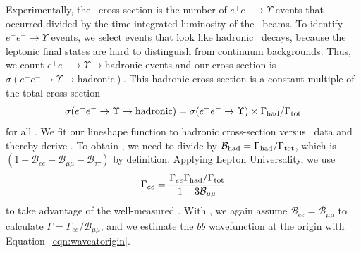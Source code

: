 \documentclass{cornell}
\begin{document}
Experimentally, the \ups\ cross-section is the number of $e^+e^- \to
\Upsilon$ events that occurred divided by the time-integrated
luminosity of the \ee\ beams.  To identify $e^+e^- \to \Upsilon$
events, we select events that look like hadronic \ups\ decays, because
the leptonic final states are hard to distinguish from continuum
backgrounds.  Thus, we count $e^+e^- \to \Upsilon \to \mbox{hadronic}$
events and our cross-section is $\sigma(e^+e^- \to \Upsilon \to
\mbox{hadronic})$.  This hadronic cross-section is a constant multiple
of the total cross-section
\begin{equation}
  \sigma(e^+e^- \to \Upsilon \to \mbox{hadronic}) = \sigma(e^+e^- \to
  \Upsilon) \times \Gamma_{\mbox{\scriptsize had}} / \Gamma_{\mbox{\scriptsize tot}}
\end{equation}
for all \ecm.  We fit our lineshape function to hadronic cross-section
versus \ecm\ data and thereby derive \geehadtot.  To obtain \gee, we
need to divide by ${\mathcal B}_{\mbox{\scriptsize had}} =
\Gamma_{\mbox{\scriptsize had}}/\Gamma_{\mbox{\scriptsize tot}}$, which is $(1 - {\mathcal B}_{ee} -
{\mathcal B}_{\mu\mu} - {\mathcal B}_{\tau\tau})$ by definition.
Applying Lepton Universality, we use
\begin{equation}
  \Gamma_{ee} = \frac{\Gamma_{ee}\Gamma_{\mbox{\scriptsize had}}/\Gamma_{\mbox{\scriptsize tot}}}{1
  - 3 {\mathcal B}_{\mu\mu}}
  \label{eqn:geehadtot:to:gee}
\end{equation}
to take advantage of the well-measured \bmm.  With \gee, we again
assume ${\mathcal B}_{ee} = {\mathcal B}_{\mu\mu}$ to calculate
$\Gamma = \Gamma_{ee} / {\mathcal B}_{\mu\mu}$, and we estimate the
$b\bar{b}$ wavefunction at the origin with Equation~\ref{eqn:waveatorigin}.
\end{document}
